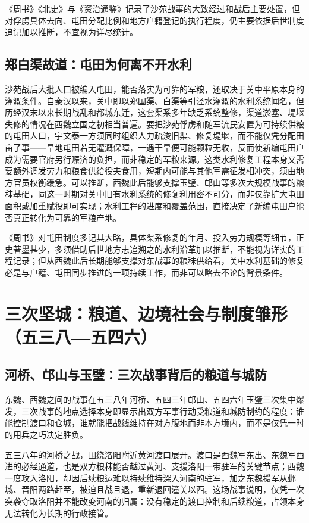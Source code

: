 《周书》《北史》与《资治通鉴》记录了沙苑战事的大致经过和战后主要处置，但对俘虏具体去向、屯田分配比例和地方户籍登记的执行程度，仍主要依据后世制度追记加以推断，不宜视为详尽统计。

\subsection{郑白渠故道：屯田为何离不开水利}

沙苑战后大批人口被编入屯田，能否落实为可靠的军粮，还取决于关中平原本身的灌溉条件。自秦汉以来，关中即以郑国渠、白渠等引泾水灌溉的水利系统闻名，但历经汉末以来长期战乱和都城东迁，这套渠系多年缺乏系统整修，渠道淤塞、堤堰失修的情况在西魏立国之初相当普遍。要把沙苑俘虏和随军流民安置为可持续供粮的屯田人口，宇文泰一方须同时组织人力疏浚旧渠、修复堤堰，而不能仅凭分配田亩了事——旱地屯田若无灌溉保障，一遇干旱便可能颗粒无收，反而使新编屯田户成为需要官府另行赈济的负担，而非稳定的军粮来源。这类水利修复工程本身又需要额外调发劳力和粮食供给役夫食用，短期内可能与其他军需征发相冲突，须由地方官员权衡缓急。可以推断，西魏此后能够支撑玉璧、邙山等多次大规模战事的粮秣基础，同这一时期对关中旧有水利系统的修复利用密不可分，而非仅靠扩大屯田面积或加重赋役即可实现；水利工程的进度和覆盖范围，直接决定了新编屯田户能否真正转化为可靠的军粮产地。

《周书》对屯田制度多记其大略，具体渠系修复的年月、投入劳力规模等细节，正史著墨甚少，多须借助后世地方志追溯之的水利沿革加以推断，不能视为详实的工程记录；但从西魏此后长期能够支撑对东战事的粮秣供给看，关中水利基础的修复必是与户籍、屯田同步推进的一项持续工作，而非可以略去不论的背景条件。

\section{三次坚城：粮道、边境社会与制度雏形（五三八—五四六）}

\subsection{河桥、邙山与玉璧：三次战事背后的粮道与城防}

东魏、西魏之间的战事在五三八年河桥、五四三年邙山、五四六年玉璧三次集中爆发，三次战事的地点选择本身即显示出双方军事行动受粮道和城防制约的程度：谁能控制渡口和仓城，谁就能把战线维持在对方腹地而非本方境内，而不是仅凭一时的用兵之巧决定胜负。

五三八年的河桥之战，围绕洛阳附近黄河渡口展开。渡口是西魏军东出、东魏军西进的必经通道，也是双方粮秣能否越过黄河、支援洛阳一带驻军的关键节点；西魏一度攻入洛阳，却因后续粮运难以持续维持深入河南的驻军，加之东魏援军从邺城、晋阳两路赶至，被迫且战且退，重新退回潼关以西。这场战事说明，仅凭一次突袭夺取洛阳并不能改变河南的归属：没有稳定的渡口控制和后续粮道，占领本身无法转化为长期的行政接管。

